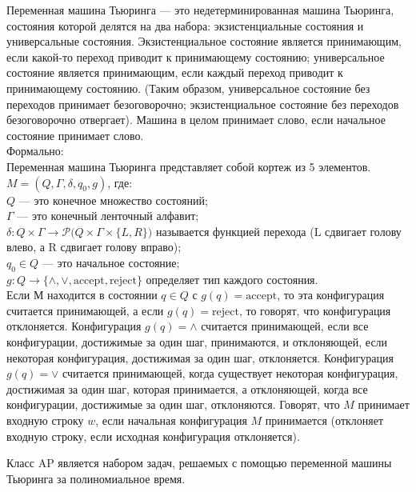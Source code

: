     \begin{Def}
        Переменная машина Тьюринга — это недетерминированная машина Тьюринга, состояния которой делятся на два набора: экзистенциальные состояния и универсальные состояния. Экзистенциальное состояние является принимающим, если какой-то переход приводит к принимающему состоянию; универсальное состояние является принимающим, если каждый переход приводит к принимающему состоянию. (Таким образом, универсальное состояние без переходов принимает безоговорочно; экзистенциальное состояние без переходов безоговорочно отвергает). Машина в целом принимает слово, если начальное состояние принимает слово.\\
        Формально:\\
        Переменная машина Тьюринга представляет собой кортеж из 5 элементов.\\
        $M = (Q, \Gamma, \delta, q_{0}, g)$, где:\\
        $Q$ --- это конечное множество состояний;\\
        $\Gamma$ --- это конечный ленточный алфавит;\\
        $\delta : Q \times \Gamma \rightarrow {\mathcal {P}(Q\times\Gamma\times\{L,R\}})$ называется функцией перехода (L сдвигает голову влево, а R сдвигает голову вправо);\\
        $q_{0} \in Q$ --- это начальное состояние;\\
        $g : Q \rightarrow \{\wedge, \vee, \text{accept}, \text{reject} \}$ определяет тип каждого состояния.\\
        Если М находится в состоянии $q\in Q$ с $g(q) = \text{accept}$, то эта конфигурация считается принимающей, а если $g(q) = \text{reject}$, то говорят, что конфигурация отклоняется. Конфигурация $g(q) = \wedge$ считается принимающей, если все конфигурации, достижимые за один шаг, принимаются, и отклоняющей, если некоторая конфигурация, достижимая за один шаг, отклоняется. Конфигурация $g(q) = \vee$ считается принимающей, когда существует некоторая конфигурация, достижимая за один шаг, которая принимается, а отклоняющей, когда все конфигурации, достижимые за один шаг, отклоняются. Говорят, что $M$ принимает входную строку $w$, если начальная конфигурация $M$ принимается (отклоняет входную строку, если исходная конфигурация отклоняется).
    \end{Def}
    \begin{Def}[Класс AP]
        Класс AP является набором задач, решаемых с помощью переменной машины Тьюринга за полиномиальное время.
    \end{Def}
    
